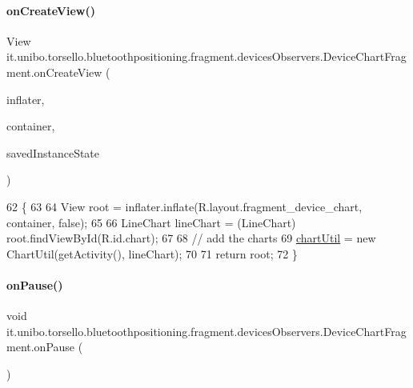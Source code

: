 \paragraph{\texorpdfstring{on\+Create\+View()}{onCreateView()}}
{\footnotesize\ttfamily View it.\+unibo.\+torsello.\+bluetoothpositioning.\+fragment.\+devices\+Observers.\+Device\+Chart\+Fragment.\+on\+Create\+View (\begin{DoxyParamCaption}\item[{Layout\+Inflater}]{inflater,  }\item[{View\+Group}]{container,  }\item[{Bundle}]{saved\+Instance\+State }\end{DoxyParamCaption})}


\begin{DoxyCode}
62                                                                                                       \{
63 
64         View root = inflater.inflate(R.layout.fragment\_device\_chart, container, \textcolor{keyword}{false});
65 
66         LineChart lineChart = (LineChart) root.findViewById(R.id.chart);
67 
68         \textcolor{comment}{// add the charts}
69         \hyperlink{classit_1_1unibo_1_1torsello_1_1bluetoothpositioning_1_1fragment_1_1devicesObservers_1_1DeviceChartFragment_afe4ee0e5d07f3efb6887428c9ef04a2e_afe4ee0e5d07f3efb6887428c9ef04a2e}{chartUtil} = \textcolor{keyword}{new} ChartUtil(getActivity(), lineChart);
70 
71         \textcolor{keywordflow}{return} root;
72     \}
\end{DoxyCode}
\hypertarget{classit_1_1unibo_1_1torsello_1_1bluetoothpositioning_1_1fragment_1_1devicesObservers_1_1DeviceChartFragment_a25bf98c9a715f133efd2f25b2f8aeb38_a25bf98c9a715f133efd2f25b2f8aeb38}{}\label{classit_1_1unibo_1_1torsello_1_1bluetoothpositioning_1_1fragment_1_1devicesObservers_1_1DeviceChartFragment_a25bf98c9a715f133efd2f25b2f8aeb38_a25bf98c9a715f133efd2f25b2f8aeb38} 
\paragraph{\texorpdfstring{on\+Pause()}{onPause()}}
{\footnotesize\ttfamily void it.\+unibo.\+torsello.\+bluetoothpositioning.\+fragment.\+devices\+Observers.\+Device\+Chart\+Fragment.\+on\+Pause (\begin{DoxyParamCaption}{ }\end{DoxyParamCaption})}


